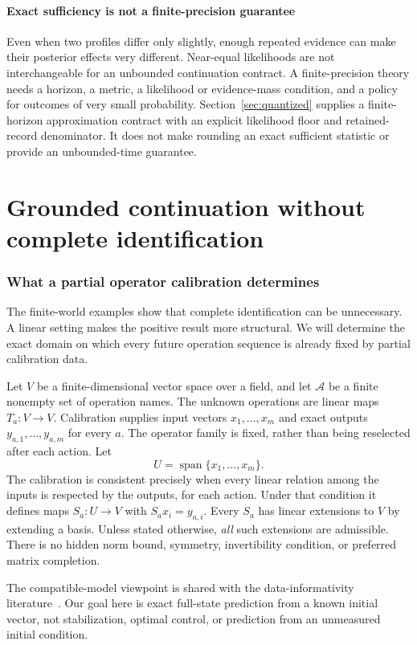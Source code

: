 \documentclass[11pt,letterpaper]{article}
\theoremstyle{plain}
\theoremstyle{definition}
\newcommand{\A}{\mathcal A}\newcommand{\C}{\mathcal C}\newcommand{\E}{\mathcal E}
\newcommand{\Span}{\operatorname{span}}\newcommand{\Pow}{\mathcal P}
\begin{document}
\subsection{Exact sufficiency is not a finite-precision guarantee}
Even when two profiles differ only slightly, enough repeated evidence can make their posterior effects very different. Near-equal likelihoods are not interchangeable for an unbounded continuation contract. A finite-precision theory needs a horizon, a metric, a likelihood or evidence-mass condition, and a policy for outcomes of very small probability. Section~\ref{sec:quantized} supplies a finite-horizon approximation contract with an explicit likelihood floor and retained-record denominator. It does not make rounding an exact sufficient statistic or provide an unbounded-time guarantee.


\FloatBarrier\clearpage
\part{Grounded continuation without complete identification}
\section{What a partial operator calibration determines}\label{sec:linear}
The finite-world examples show that complete identification can be unnecessary. A linear setting makes the positive result more structural. We will determine the exact domain on which every future operation sequence is already fixed by partial calibration data.

Let $V$ be a finite-dimensional vector space over a field, and let $\A$ be a finite nonempty set of operation names. The unknown operations are linear maps $T_a:V\to V$. Calibration supplies input vectors $x_1,\ldots,x_m$ and exact outputs $y_{a,1},\ldots,y_{a,m}$ for every $a$. The operator family is fixed, rather than being reselected after each action. Let
\[
U=\Span\{x_1,\ldots,x_m\}.
\]
The calibration is consistent precisely when every linear relation among the inputs is respected by the outputs, for each action. Under that condition it defines maps $S_a:U\to V$ with $S_ax_i=y_{a,i}$. Every $S_a$ has linear extensions to $V$ by extending a basis. Unless stated otherwise, \emph{all} such extensions are admissible. There is no hidden norm bound, symmetry, invertibility condition, or preferred matrix completion.

The compatible-model viewpoint is shared with the data-informativity literature~\cite{informativity}. Our goal here is exact full-state prediction from a known initial vector, not stabilization, optimal control, or prediction from an unmeasured initial condition.
\end{document}
